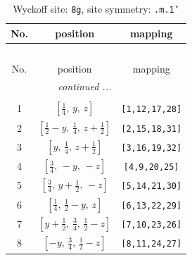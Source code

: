 \documentclass[fleqn,8pt]{jsarticle}
\begin{document}
\begin{longtable}{ccc}
\caption{Wyckoff site: {\tt 8g}, site symmetry: {\tt .m.1'}}
 \\
 \hline \hline
No. & position & mapping \\ \hline \endfirsthead

\multicolumn{2}{l}{\tablename\ \thetable{}} \\
 \hline \hline
No. & position & mapping \\ \hline \endhead

 \hline \hline
\multicolumn{2}{r}{\footnotesize\it continued ...} \\ \endfoot

 \hline \hline
\multicolumn{2}{r}{} \\ \endlastfoot

1 & $\left[ \frac{1}{4},\, y,\, z \right]$ & {\tt [1,12,17,28]} \\ \hline
2 & $\left[ \frac{1}{2} - y,\, \frac{1}{4},\, z + \frac{1}{2} \right]$ & {\tt [2,15,18,31]} \\ \hline
3 & $\left[ y,\, \frac{1}{4},\, z + \frac{1}{2} \right]$ & {\tt [3,16,19,32]} \\ \hline
4 & $\left[ \frac{3}{4},\, - y,\, - z \right]$ & {\tt [4,9,20,25]} \\ \hline
5 & $\left[ \frac{3}{4},\, y + \frac{1}{2},\, - z \right]$ & {\tt [5,14,21,30]} \\ \hline
6 & $\left[ \frac{1}{4},\, \frac{1}{2} - y,\, z \right]$ & {\tt [6,13,22,29]} \\ \hline
7 & $\left[ y + \frac{1}{2},\, \frac{3}{4},\, \frac{1}{2} - z \right]$ & {\tt [7,10,23,26]} \\ \hline
8 & $\left[ - y,\, \frac{3}{4},\, \frac{1}{2} - z \right]$ & {\tt [8,11,24,27]} \\
\end{longtable}
\renewcommand{\arraystretch}{1.2}
\end{document}
